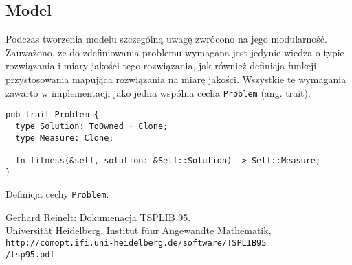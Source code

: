 \documentclass[12pt,a4paper]{article}
\begin{document}
\subsection{Model}

Podczas tworzenia modelu szczególną uwagę zwrócono na jego modularność. Zauważono, że do zdefiniowania problemu wymagana jest jedynie wiedza o typie rozwiązania i miary jakości tego rozwiązania, jak również definicja funkcji przystosowania mapująca rozwiązania na miarę jakości. Wszystkie te wymagania zawarto w implementacji jako jedna wspólna cecha \texttt{Problem} (ang. trait).
\begin{listing}[H]
  \begin{verbatim}
pub trait Problem {
  type Solution: ToOwned + Clone;
  type Measure: Clone;

  fn fitness(&self, solution: &Self::Solution) -> Self::Measure;
}
  \end{verbatim}
  \caption{Definicja cechy \texttt{Problem}.}
\end{listing}

\begin{thebibliography}{9}
  Gerhard Reinelt: Dokumenacja TSPLIB 95.\\
  Universit{\"a}t Heidelberg, Institut f{\"u}ur Angewandte Mathematik,
  \texttt{http://comopt.ifi.uni-heidelberg.de/software/TSPLIB95\\/tsp95.pdf}
\end{thebibliography}
 
\end{document}
